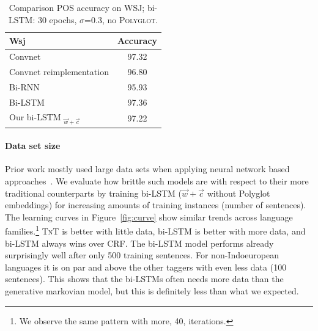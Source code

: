 \documentclass[11pt]{article}
\begin{document}
\begin{table}\centering
\begin{small}
\begin{tabular}{lc}
\toprule
{\sc Wsj} & Accuracy\\
\midrule
Convnet \cite{santos:zadrozny:2014} & 97.32\\
Convnet reimplementation \cite{ling:ea:2015} & 96.80\\
Bi-RNN \cite{ling:ea:2015} & 95.93\\
Bi-LSTM \cite{ling:ea:2015} & 97.36\\
\midrule
Our bi-LSTM $_{\vec{w}+\vec{c}}$ & 97.22\\
\bottomrule
\end{tabular}
\end{small}
\caption{Comparison POS accuracy on WSJ; bi-LSTM: 30 epochs, $\sigma$=$0.3$, no \textsc{Polyglot}.}
\label{tbl:WSJ}
\end{table}


\paragraph{Data set size} Prior work mostly used large data sets when applying neural network based 
approaches~\cite{zhang:ea:2015:char}. We evaluate how brittle such models are with respect to their more
traditional counterparts by training bi-LSTM ($\vec{w}+\vec{c}$ without Polyglot embeddings) for increasing amounts of training instances (number of sentences). The learning curves in Figure~\ref{fig:curve} 
show similar trends across language families.\footnote{We observe the same pattern with more, 40, iterations.} 
\textsc{TnT} is better with little data, bi-LSTM is better with more data, 
and bi-LSTM always wins over CRF. The bi-LSTM model performs already surprisingly well after only 500 training sentences. 
For non-Indoeuropean languages it is on par and above the other taggers with even less data (100 sentences). 
This shows that the bi-LSTMs often needs more data than the generative markovian model, but this is definitely less than what we expected. 
\end{document}
